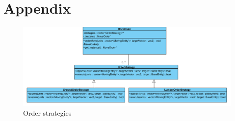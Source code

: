 \section{Appendix}
\begin{figure}[!htb]
    \centering
    \includegraphics[angle=-90,origin=c,scale=0.65]
    {images/order-strategies.PNG}
    \caption{Order strategies}\label{fig:orderstrategies}
\end{figure}
